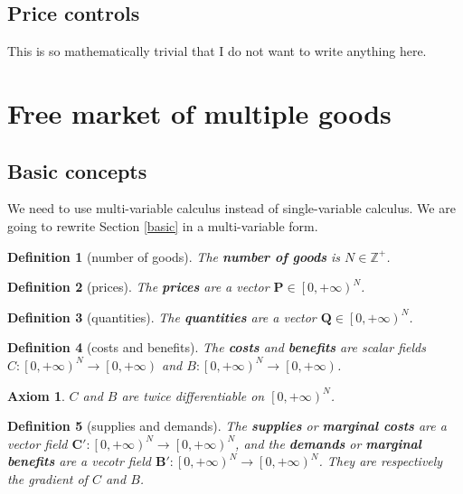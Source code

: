 \documentclass{article}
\newtheorem{axiom}{Axiom}[subsection]
\newtheorem{definition}{Definition}[subsection]
\begin{document}
\subsection{Price controls}

This is so mathematically trivial that I do not want to write anything here.

\section{Free market of multiple goods}

\subsection{Basic concepts}

We need to use multi-variable calculus instead of single-variable calculus.
We are going to rewrite Section \ref{basic} in a multi-variable form.

\begin{definition}[number of goods]
The \textbf{number of goods} is $N\in\mathbb Z^+$.
\end{definition}

\begin{definition}[prices]
The \textbf{prices} are a vector $\mathbf P\in\left[0,+\infty\right)^N$.
\end{definition}

\begin{definition}[quantities]
The \textbf{quantities} are a vector $\mathbf Q\in\left[0,+\infty\right)^N$.
\end{definition}

\begin{definition}[costs and benefits]
The \textbf{costs} and \textbf{benefits} are scalar fields $C:\left[0,+\infty\right)^N\to\left[0,+\infty\right)$ and $B:\left[0,+\infty\right)^N\to\left[0,+\infty\right)$.
\end{definition}

\begin{axiom}
$C$ and $B$ are twice differentiable on $\left[0,+\infty\right)^N$.
\end{axiom}

\begin{definition}[supplies and demands]
The \textbf{supplies} or \textbf{marginal costs} are a vector field $\mathbf C':\left[0,+\infty\right)^N\to\left[0,+\infty\right)^N$, and the \textbf{demands} or \textbf{marginal benefits} are a vecotr field $\mathbf B':\left[0,+\infty\right)^N\to\left[0,+\infty\right)^N$.
They are respectively the gradient of $C$ and $B$.
\end{definition}
\end{document}
